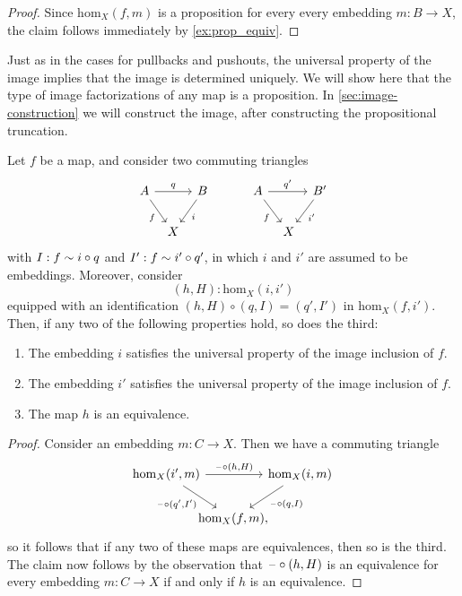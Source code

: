 \begin{proof}
Since $\mathrm{hom}_X(f,m)$ is a proposition for every every embedding $m:B\to X$, the claim follows immediately by \cref{ex:prop_equiv}.
\end{proof}

Just as in the cases for pullbacks and pushouts, the universal property of the image implies that the image is determined uniquely. We will show here that the type of image factorizations of any map is a proposition. In \cref{sec:image-construction} we will construct the image, after constructing the propositional truncation.

\begin{prp}
  Let $f$ be a map, and consider two commuting triangles
  \begin{equation*}
    \begin{tikzcd}[column sep=tiny]
      A \arrow[dr,swap,"f"] \arrow[rr,"q"] & & B \arrow[dl,"i"] &[2em] A \arrow[dr,swap,"f"] \arrow[rr,"{q'}"] & & B' \arrow[dl,"{i'}"] \\
      & X & & \phantom{B'} & X
    \end{tikzcd}
  \end{equation*}
  with $I:f\sim i\circ q$ and $I':f\sim i'\circ q'$, in which $i$ and $i'$ are assumed to be embeddings. Moreover, consider
  \begin{equation*}
    (h,H):\mathrm{hom}_X(i,i')
  \end{equation*}
  equipped with an identification $(h,H)\circ(q,I)=(q',I')$ in $\mathrm{hom}_X(f,i')$. Then, if any two of the following properties hold, so does the third:
  \begin{enumerate}
  \item The embedding $i$ satisfies the universal property of the image inclusion of $f$.
  \item The embedding $i'$ satisfies the universal property of the image inclusion of $f$.
  \item The map $h$ is an equivalence.
  \end{enumerate}
\end{prp}

\begin{proof}
  Consider an embedding $m:C\to X$. Then we have a commuting triangle
  \begin{equation*}
    \begin{tikzcd}[column sep=-1em]
      \mathrm{hom}_X(i',m) \arrow[rr,"{\blank\circ(h,H)}"] \arrow[dr,swap,"{\blank\circ(q',I')}"] & & \mathrm{hom}_X(i,m) \arrow[dl,"{\blank\circ(q,I)}"] \\
      & \mathrm{hom}_X(f,m), & \phantom{\mathrm{hom}_X(i',m)}
    \end{tikzcd}
  \end{equation*}
  so it follows that if any two of these maps are equivalences, then so is the third. The claim now follows by the observation that $\mathord{\hspace{1pt}\text{--}\hspace{1pt}}\circ(h,H)$ is an equivalence for every embedding $m:C\to X$ if and only if $h$ is an equivalence.
\end{proof}

